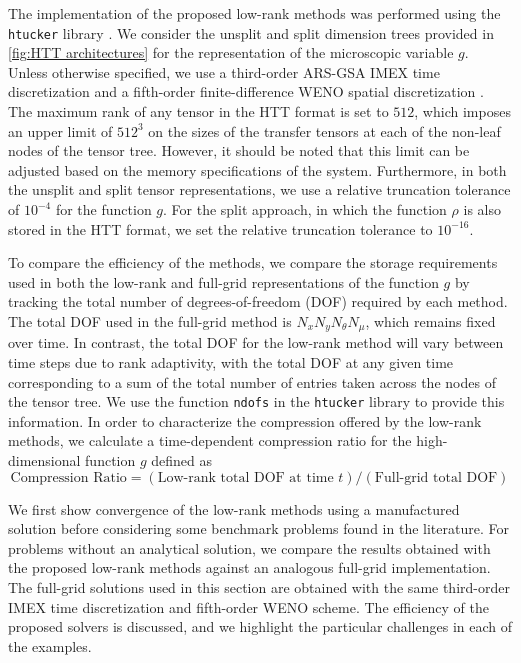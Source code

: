 \documentclass[onefignum,onetabnum]{siamart220329}
\begin{document}
The implementation of the proposed low-rank methods was performed using the \texttt{htucker} library \cite{kressner2012htucker}. We consider the unsplit and split dimension trees provided in \cref{fig:HTT architectures} for the representation of the microscopic variable $g$. Unless otherwise specified, we use a third-order ARS-GSA IMEX time discretization \cite{BoscarinoAP-IMEX2013} and a fifth-order finite-difference WENO spatial discretization \cite{shu2009high}. The maximum rank of any tensor in the HTT format is set to $512$, which imposes an upper limit of $512^{3}$ on the sizes of the transfer tensors at each of the non-leaf nodes of the tensor tree. However, it should be noted that this limit can be adjusted based on the memory specifications of the system. Furthermore, in both the unsplit and split tensor representations, we use a relative truncation tolerance of $10^{-4}$ for the function $g$. For the split approach, in which the function $\rho$ is also stored in the HTT format, we set the relative truncation tolerance to $10^{-16}$. 

To compare the efficiency of the methods, we compare the storage requirements used in both the low-rank and full-grid representations of the function $g$ by tracking the total number of degrees-of-freedom (DOF) required by each method. The total DOF used in the full-grid method is $N_{x} N_{y} N_{\theta} N_{\mu}$, which remains fixed over time. In contrast, the total DOF for the low-rank method will vary between time steps due to rank adaptivity, with the total DOF at any given time corresponding to a sum of the total number of entries taken across the nodes of the tensor tree. We use the function \texttt{ndofs} in the \texttt{htucker} library to provide this information. In order to characterize the compression offered by the low-rank methods, we calculate a time-dependent compression ratio for the high-dimensional function $g$ defined as
\begin{equation}
    \label{eq:compression ratio}
    \text{Compression Ratio} = (\text{Low-rank total DOF at time $t$})/(\text{Full-grid total DOF})
\end{equation}

We first show convergence of the low-rank methods using a manufactured solution before considering some benchmark problems found in the literature. For problems without an analytical solution, we compare the results obtained with the proposed low-rank methods against an analogous full-grid implementation. The full-grid solutions used in this section are obtained with the same third-order IMEX time discretization and fifth-order WENO scheme. The efficiency of the proposed solvers is discussed, and we highlight the particular challenges in each of the examples.
\end{document}
